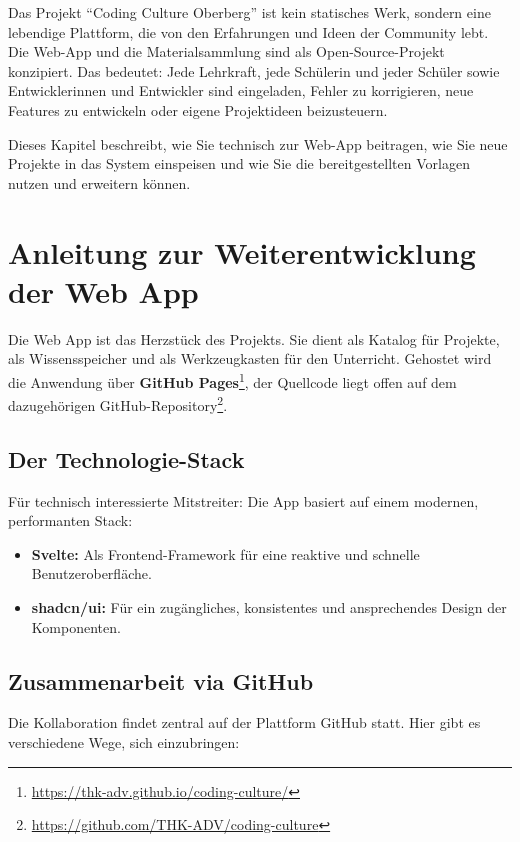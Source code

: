 \documentclass[a5paper,pagesize,10pt,bibtotoc,pointlessnumbers,
normalheadings,DIV=9,twoside=false]{scrbook}
\begin{document}
Das Projekt ``Coding Culture Oberberg'' ist kein statisches Werk, sondern eine lebendige Plattform, die von den Erfahrungen und Ideen der Community lebt. Die Web-App und die Materialsammlung sind als Open-Source-Projekt konzipiert. Das bedeutet: Jede Lehrkraft, jede Schülerin und jeder Schüler sowie Entwicklerinnen und Entwickler sind eingeladen, Fehler zu korrigieren, neue Features zu entwickeln oder eigene Projektideen beizusteuern.

Dieses Kapitel beschreibt, wie Sie technisch zur Web-App beitragen, wie Sie neue Projekte in das System einspeisen und wie Sie die bereitgestellten Vorlagen nutzen und erweitern können.

\section*{Anleitung zur Weiterentwicklung der Web App}

Die Web App ist das Herzstück des Projekts. Sie dient als Katalog für Projekte, als Wissensspeicher und als Werkzeugkasten für den Unterricht. Gehostet wird die Anwendung über \textbf{GitHub Pages}\footnote{\url{https://thk-adv.github.io/coding-culture/}}, der Quellcode liegt offen auf dem dazugehörigen GitHub-Repository\footnote{\url{https://github.com/THK-ADV/coding-culture}}.

\subsection*{Der Technologie-Stack}
Für technisch interessierte Mitstreiter: Die App basiert auf einem modernen, performanten Stack:
\begin{itemize}
    \item \textbf{Svelte:} Als Frontend-Framework für eine reaktive und schnelle Benutzeroberfläche.
    \item \textbf{shadcn/ui:} Für ein zugängliches, konsistentes und ansprechendes Design der Komponenten.
\end{itemize}

\subsection*{Zusammenarbeit via GitHub}
Die Kollaboration findet zentral auf der Plattform GitHub statt. Hier gibt es verschiedene Wege, sich einzubringen:
\end{document}
